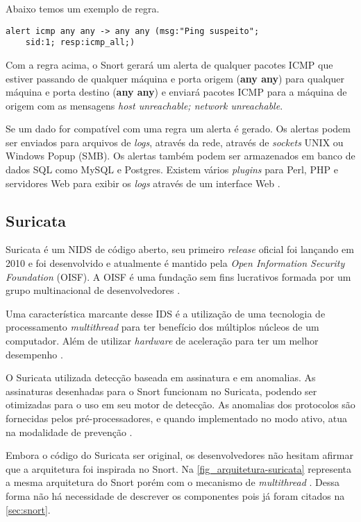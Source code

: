 Abaixo temos um exemplo de regra.

\begin{lstlisting}[frame=single]
    alert icmp any any -> any any (msg:"Ping suspeito"; 
    sid:1; resp:icmp_all;)
\end{lstlisting}

Com a regra acima, o Snort gerará um alerta de qualquer pacotes ICMP que estiver passando de qualquer máquina e porta origem (\textbf{any any}) para qualquer máquina e porta destino (\textbf{any any}) e enviará pacotes ICMP para a máquina de origem com as mensagens \textit{host unreachable; network unreachable}.

Se um dado for compatível com uma regra um alerta é gerado. Os alertas podem ser enviados para arquivos de \textit{logs}, através da rede, através de \textit{sockets} UNIX ou Windows Popup (SMB). Os alertas também podem ser armazenados em banco de dados SQL como MySQL e Postgres. Existem vários \textit{plugins} para Perl, PHP e servidores Web para exibir os \textit{logs} através de um interface Web \cite{snort:andrew}.

\subsection{Suricata} \label{sec:suricata}

Suricata é um NIDS de código aberto, seu primeiro \textit{release} oficial foi lançando em 2010 e foi desenvolvido e atualmente é mantido pela \textit{Open Information Security Foundation} (OISF). A OISF é uma fundação sem fins lucrativos formada por um grupo multinacional de desenvolvedores \cite{suricata}.

Uma característica marcante desse IDS é a utilização de uma tecnologia de processamento \textit{multithread} para ter benefício dos múltiplos núcleos de um computador. Além de utilizar \textit{hardware} de aceleração para ter um melhor desempenho \cite{arquitetura:martin}.

O Suricata utilizada detecção baseada em assinatura e em anomalias. As assinaturas desenhadas para o Snort funcionam no Suricata, podendo ser otimizadas para o uso em seu motor de detecção. As anomalias dos protocolos são fornecidas pelos pré-processadores, e quando implementado no modo ativo, atua na modalidade de prevenção \cite{arquitetura:martin}.

Embora o código do Suricata ser original, os desenvolvedores não hesitam afirmar que a arquitetura foi inspirada no Snort. Na \autoref{fig_arquitetura-suricata} representa a mesma arquitetura do Snort porém com o mecanismo de \textit{multithread} \cite{arquitetura:martin}. Dessa forma não há necessidade de descrever os componentes pois já foram citados na \autoref{sec:snort}.

